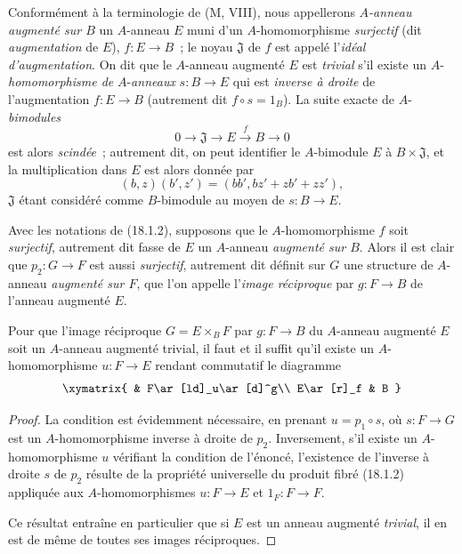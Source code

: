 \begin{env}[18.1.4]
\label{0.18.1.4-fr}
Conformément à la terminologie de (M, VIII), nous appellerons
\emph{$A$-anneau augmenté sur $B$} un $A$-anneau $E$ muni d'un
$A$-homomorphisme \emph{surjectif} (dit \emph{augmentation} de $E$),
$f:E\to B$~; le noyau $\mathfrak{J}$ de $f$ est appelé
l'\emph{idéal d'augmentation}. On dit que le $A$-anneau augmenté $E$ est
\emph{trivial} s'il existe un $A$-\emph{homomorphisme de} $A$-\emph{anneaux} $s:B\to E$
qui est \emph{inverse à droite} de l'augmentation $f:E\to B$ (autrement dit
$f\circ s=1_B$). La suite exacte de $A$-\emph{bimodules}
\[
  0\longrightarrow\mathfrak{J}\longrightarrow E
  \xrightarrow{f}B\longrightarrow0
\]
est alors \emph{scindée}~; autrement dit, on peut identifier le $A$-bimodule
$E$ à $B\times\mathfrak{J}$, et la multiplication dans $E$ est alors donnée
par
\[
  (b,z)(b',z')=(bb',bz'+zb'+zz'),
\]
$\mathfrak{J}$ étant considéré comme $B$-bimodule au moyen de $s:B\to E$.
\end{env}

\begin{env}[18.1.5]
\label{0.18.1.5-fr}
Avec les notations de (18.1.2), supposons que le $A$-homomorphisme $f$ soit
\emph{surjectif}, autrement dit fasse de $E$ un $A$-anneau \emph{augmenté sur
$B$}. Alors il est clair que $p_2:G\to F$ est aussi \emph{surjectif},
autrement dit définit sur $G$ une structure de $A$-anneau \emph{augmenté sur
$F$}, que l'on appelle l'\emph{image réciproque} par $g:F\to B$ de l'anneau
augmenté $E$.
\end{env}

\begin{proposition}[18.1.6]
\label{0.18.1.6-fr}
Pour que l'image réciproque $G=E\times_BF$ par $g:F\to B$ du $A$-anneau
augmenté $E$ soit un $A$-anneau augmenté trivial, il faut et il suffit qu'il
existe un $A$-homomorphisme $u:F\to E$ rendant commutatif le diagramme
\[
  \xymatrix{
    & F\ar[ld]_u\ar[d]^g\\
    E\ar[r]_f & B
  }
\]
\end{proposition}

\begin{proof}
La condition est évidemment nécessaire, en prenant $u=p_1\circ s$, où
$s:F\to G$ est un $A$-homomorphisme inverse à droite de $p_2$. Inversement,
s'il existe un $A$-homomorphisme $u$ vérifiant la condition de l'énoncé,
l'existence de l'inverse à droite $s$ de $p_2$ résulte de la propriété
universelle du produit fibré (18.1.2) appliquée aux $A$-homomorphismes
$u:F\to E$ et $1_F:F\to F$.

Ce résultat entraîne en particulier que si $E$ est un anneau augmenté
\emph{trivial}, il en est de même de toutes ses images réciproques.
\end{proof}


